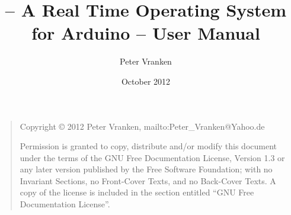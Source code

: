 \documentclass[10pt,twoside,a4paper,openany]{report}
\title{\rtos \linebreak -- A Real Time Operating System for Arduino -- \linebreak User Manual}
\author{Peter Vranken}
\date{October 2012}
\begin{document}
\maketitle

\bigskip
\begin{quote}
    Copyright \copyright{} 2012  Peter Vranken, mailto:Peter\_Vranken@Yahoo.de
    
    Permission is granted to copy, distribute and/or modify this document
    under the terms of the GNU Free Documentation License, Version 1.3
    or any later version published by the Free Software Foundation;
    with no Invariant Sections, no Front-Cover Texts, and no Back-Cover Texts.
    A copy of the license is included in the section entitled ``GNU
    Free Documentation License''.
\end{quote}
\bigskip


\tableofcontents {}






\end{document}
